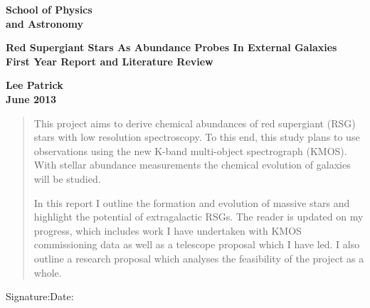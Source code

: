 \documentclass[a4paper,12pt]{article}
\begin{document}
\epsfxsize=40mm                         %
\begin{minipage}[b]{110mm}
        {\Huge\bf School of Physics \\and Astronomy
        \vspace*{17mm}}
\end{minipage}
\hfill
\begin{minipage}[t]{40mm}               
\end{minipage}
\par\noindent                                           %
\vspace*{2cm}
\begin{center}
        \Large\bf Red Supergiant Stars As Abundance Probes In External Galaxies\\
        \Large\bf First Year Report and Literature Review
\end{center}
\vspace*{1.5cm}
\begin{center}
        \bf Lee Patrick\\                 %
        June 2013                         %
\end{center}
\vspace*{5mm}
%
%                       
\begin{abstract}

This project aims to derive chemical abundances of red supergiant (RSG) stars with low resolution spectroscopy. 
To this end, this study plans to use observations using the new K-band multi-object spectrograph (KMOS). 
With stellar abundance measurements the chemical evolution of galaxies will be studied.

In this report I outline the formation and evolution of massive stars and highlight the potential of extragalactic RSGs. 
The reader is updated on my progress, which includes work I have undertaken with KMOS commissioning data as well as a telescope proposal which I have led. 
I also outline a research proposal which analyses the feasibility of the project as a whole. 

\end{abstract}

\vspace*{1cm}

\vspace*{3cm}
Signature:\hspace*{8cm}Date:
\end{document}
